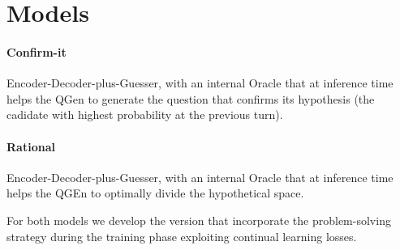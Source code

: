 \section{Models}
\label{sec:models}

\paragraph{Confirm-it} Encoder-Decoder-plus-Guesser, with an internal
Oracle that at inference time helps the QGen to generate the question
that confirms its hypothesis (the cadidate with highest probability at
the previous turn). 

\paragraph{Rational} Encoder-Decoder-plus-Guesser, with an internal
Oracle that at inference time helps the QGEn to optimally divide the
hypothetical space. 

For both models we develop the version that incorporate the
problem-solving strategy during the training phase exploiting
continual learning losses.




